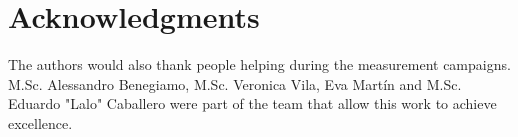 \documentclass[lettersize,journal]{IEEEtran}
\begin{document}
\section*{Acknowledgments}
\label{sec:acks}
The authors would also thank people helping during the measurement campaigns. M.Sc. Alessandro Benegiamo, M.Sc. Veronica Vila, Eva Martín and M.Sc. Eduardo "Lalo" Caballero were part of the team that allow this work to achieve excellence.   








 
%
%
\end{document}
